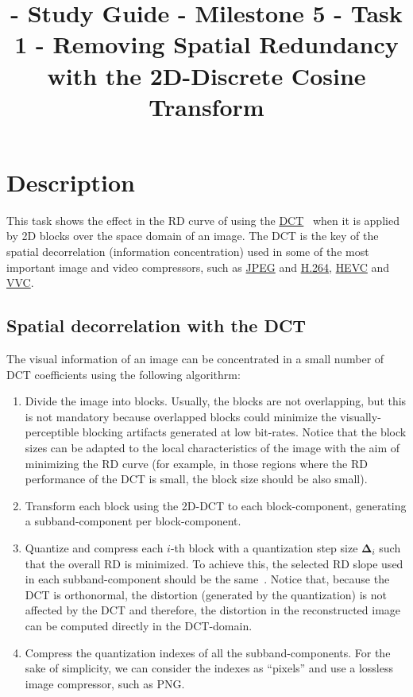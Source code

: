 

\title{\SM{} - Study Guide - Milestone 5 - Task 1 - Removing Spatial Redundancy with the 2D-Discrete Cosine Transform}

\maketitle

\tableofcontents

\section{Description}

This task shows the effect in the RD curve of using the
\href{https://en.wikipedia.org/wiki/Discrete_cosine_transform}{DCT}~\cite{vruiz__DCT}
when it is applied by 2D blocks over the space domain of an image. The
DCT is the key of the spatial decorrelation (information
concentration) used in some of the most important image and video
compressors, such as \href{https://en.wikipedia.org/wiki/JPEG}{JPEG}
and \href{https://en.wikipedia.org/wiki/Advanced_Video_Coding}{H.264},
\href{https://en.wikipedia.org/wiki/Advanced_Video_Coding}{HEVC} and
\href{https://en.wikipedia.org/wiki/Versatile_Video_Coding}{VVC}.

\subsection{Spatial decorrelation with the DCT}

The visual information of an image can be concentrated in a small
number of DCT coefficients using the following algorithrm:
\begin{enumerate}
\item Divide the image into blocks. Usually, the blocks are not
  overlapping, but this is not mandatory because overlapped blocks
  could minimize the visually-perceptible blocking artifacts generated
  at low bit-rates. Notice that the block sizes can be adapted to the
  local characteristics of the image with the aim of minimizing the RD
  curve (for example, in those regions where the RD performance of the
  DCT is small, the block size should be also small).
\item Transform each block using the 2D-DCT to each block-component,
  generating a subband-component per block-component.
\item Quantize and compress each $i$-th block with a quantization step
  size ${\mathbf\Delta}_i$ such that the overall RD is minimized. To
  achieve this, the selected RD slope used in each subband-component
  should be the same~\cite{vetterli2014foundations}. Notice that,
  because the DCT is orthonormal, the distortion (generated by the
  quantization) is not affected by the DCT and therefore, the
  distortion in the reconstructed image can be computed directly in
  the DCT-domain.
\item Compress the quantization indexes of all the
  subband-components. For the sake of simplicity, we can consider the
  indexes as ``pixels'' and use a lossless image compressor, such as
  PNG.
\end{enumerate}

